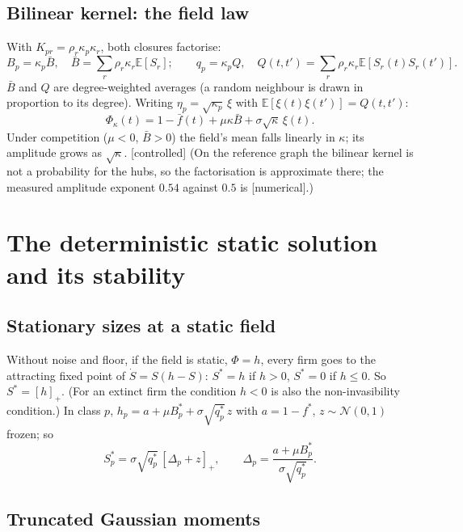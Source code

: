 \documentclass[11pt]{article}
\newcommand{\E}{\mathbb E}
\newcommand{\fb}{\bar f}
\newcommand{\controlled}{\textsf{\small[controlled]}}
\newcommand{\numer}{\textsf{\small[numerical]}}
\begin{document}
\subsection{Bilinear kernel: the field law}

With $K_{pr}=\rho_r\kappa_p\kappa_r$, both closures factorise:
\begin{equation}
B_p=\kappa_p\bar B,\quad \bar B=\sum_r\rho_r\kappa_r\E[S_r];\qquad q_p=\kappa_pQ,\quad Q(t,t')=\sum_r\rho_r\kappa_r\E[S_r(t)S_r(t')] .
\end{equation}
$\bar B$ and $Q$ are degree-weighted averages (a random neighbour is drawn in proportion to its degree).
Writing $\eta_p=\sqrt{\kappa_p}\,\xi$ with $\E[\xi(t)\xi(t')]=Q(t,t')$:
\begin{equation}
\boxed{\Phi_\kappa(t)=1-\fb(t)+\mu\kappa\bar B+\sigma\sqrt\kappa\,\xi(t).}
\label{eq:fieldlaw}
\end{equation}
Under competition ($\mu<0$, $\bar B>0$) the field's mean falls linearly in $\kappa$; its amplitude grows as
$\sqrt\kappa$.  \controlled{}  (On the reference graph the bilinear kernel is not a probability for the hubs,
so the factorisation is approximate there; the measured amplitude exponent $0.54$ against $0.5$ is \numer.)

\section{The deterministic static solution and its stability}
\label{sec:static}

\subsection{Stationary sizes at a static field}

Without noise and floor, if the field is static, $\Phi=h$, every firm goes to the attracting fixed point of
$\dot S=S(h-S)$: $S^*=h$ if $h>0$, $S^*=0$ if $h\le0$.  So $S^*=[h]_+$.  (For an extinct firm the condition
$h<0$ is also the non-invasibility condition.)  In class $p$, $h_p=a+\mu B_p^*+\sigma\sqrt{q_p^*}\,z$ with
$a=1-f^*$, $z\sim\mathcal N(0,1)$ frozen; so
\begin{equation}
S_p^*=\sigma\sqrt{q_p^*}\,[\Delta_p+z]_+,\qquad \Delta_p=\frac{a+\mu B_p^*}{\sigma\sqrt{q_p^*}} .
\end{equation}

\subsection{Truncated Gaussian moments}
\end{document}
